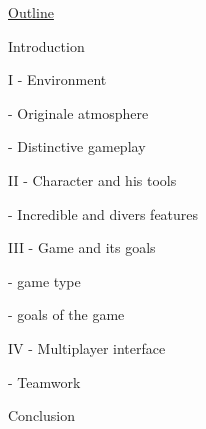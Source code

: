 \documentclass[a4paper]{article}
\begin{document}
\pagestyle{fancy}


\Large

\begin{center}

\underline{Outline}

\end{center}

\quad

Introduction

\quad
\quad

I - Environment 


	- Originale atmosphere


	- Distinctive gameplay


\quad
\quad


II  -  Character and his tools

\quad

	- Incredible and divers features



\quad
\quad

III - Game and its goals

\quad

	- game type

	- goals of the game


\quad
\quad


IV - Multiplayer interface 

	- Teamwork

\quad

\quad

Conclusion 
\end{document}
